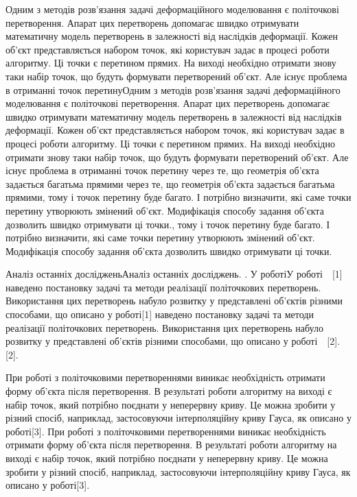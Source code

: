 \documentclass[12pt,a4paper]{article}
\begin{document}
Одним з методів розв’язання задачі деформаційного моделювання є політочкові перетворення. Апарат цих перетворень допомагає швидко отримувати математичну модель перетворень в залежності від наслідків деформації. Кожен об’єкт представляється набором точок, які  користувач задає в процесі роботи алгоритму. Ці точки є перетином прямих. На виході необхідно отримати знову таки набір точок, що будуть формувати перетворений об’єкт. Але існує проблема в отриманні точок перетинуОдним з методів розв’язання задачі деформаційного моделювання є політочкові перетворення. Апарат цих перетворень допомагає швидко отримувати математичну модель перетворень в залежності від наслідків деформації. Кожен об’єкт представляється набором точок, які  користувач задає в процесі роботи алгоритму. Ці точки є перетином прямих. На виході необхідно отримати знову таки набір точок, що будуть формувати перетворений об’єкт. Але існує проблема в отриманні точок перетину через те, що геометрія об’єкта задається багатьма прямими через те, що геометрія об’єкта задається багатьма прямими, тому і точок перетину буде багато. І потрібно визначити, які саме точки перетину утворюють змінений об’єкт. Модифікація способу задання об’єкта дозволить швидко отримувати ці точки., тому і точок перетину буде багато. І потрібно визначити, які саме точки перетину утворюють змінений об’єкт. Модифікація способу задання об’єкта дозволить швидко отримувати ці точки.
\par
Аналіз останніх дослідженьАналіз останніх досліджень. . У роботіУ роботі  [1] наведено постановку задачі та методи реалізації політочкових перетворень. Використання цих перетворень набуло розвитку у представлені об’єктів різними способами, що описано у роботі[1] наведено постановку задачі та методи реалізації політочкових перетворень. Використання цих перетворень набуло розвитку у представлені об’єктів різними способами, що описано у роботі  [2]. [2].
\par
При роботі з політочковими перетвореннями виникає необхідність отримати форму об’єкта після перетворення. В результаті роботи алгоритму на виході є набір точок, який потрібно поєднати у неперервну криву. Це можна зробити у різний спосіб, наприклад, застосовуючи інтерполяційну криву Гауса, як описано у роботі[3]. При роботі з політочковими перетвореннями виникає необхідність отримати форму об’єкта після перетворення. В результаті роботи алгоритму на виході є набір точок, який потрібно поєднати у неперервну криву. Це можна зробити у різний спосіб, наприклад, застосовуючи інтерполяційну криву Гауса, як описано у роботі[3].
\end{document}
